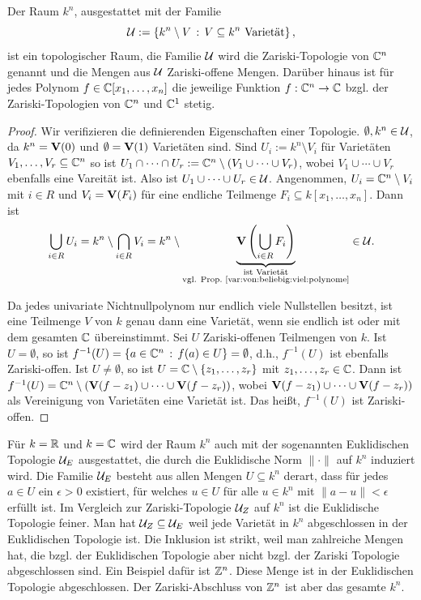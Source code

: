 \documentclass[11pt]{article}
\numberwithin{equation}{section}
\begin{document}
\begin{theorem}
	Der Raum $k^n$, ausgestattet  mit der Familie
	\[
	\mathcal{U}:=\left\{  k^n \setminus V  \,:\, V \subseteq k^n \ \text{Varietät} \right\},
	\] ist ein topologischer Raum, die Familie $\mathcal{U}$ wird die Zariski-Topologie von $\mathbb{C}^n$ genannt und die Mengen aus $\mathcal{U}$ Zariski-offene Mengen.  Darüber hinaus ist für jedes Polynom $f  \in \mathbb{C}[x_1,\ldots,x_n]$ die jeweilige Funktion $f : \mathbb{C}^n \to \mathbb{C}$ bzgl. der Zariski-Topologien von $\mathbb{C}^n$ und $\mathbb{C}^1$ stetig. 
\end{theorem} 
\begin{proof} 
	Wir verifizieren die definierenden Eigenschaften einer Topologie. 
	$\emptyset, k^n \in \mathcal{U}$, da $k^n = \mathbf{V}(0) $ und $\emptyset = \mathbf{V}(1)$ Varietäten sind. Sind $U_i := k^n \setminus V_i$ für Varietäten $V_1,\ldots,V_r \subseteq \mathbb{C}^n$ so ist $U_1 \cap \cdots \cap U_r := \mathbb{C}^n \setminus (V_1 \cup \cdots \cup V_r)$, wobei $V_1 \cup \cdots \cup V_r$ ebenfalls eine Vareität ist. Also ist $U_1 \cup \cdots \cup U_r \in \mathcal{U}$. Angenommen, $U_i = \mathbb{C}^n \setminus V_i$ mit $i \in R$ und $V_i = \mathbf{V}(F_i)$ für eine endliche Teilmenge $F_i \subseteq k[x_1,\ldots,x_n]$. Dann ist 
	\[
	\bigcup_{i \in R} U_i = k^n \setminus \bigcap_{i \in R} V_i = k^n \setminus  \underbrace{\mathbf{V} \left( \bigcup_{i \in R} F_i \right)}_{\substack{\text{ist Varietät} \\\text{vgl. Prop.~\ref{var:von:beliebig:viel:polynome}}}} \in \mathcal{U}.
	\]
	
	Da jedes univariate Nichtnullpolynom  nur endlich viele Nullstellen besitzt, ist eine Teilmenge $V$ von $k$ genau dann eine Varietät, wenn sie endlich ist oder mit dem gesamten $\mathbb{C}$ übereinstimmt. Sei $U$ Zariski-offenen Teilmengen von $k$. Ist $U = \emptyset$, so ist $f^{-1}(U) = \left\{ a \in \mathbb{C}^n \,:\, f(a) \in U \right\} = \emptyset$, d.h., $f^{-1}(U)$ ist ebenfalls Zariski-offen. Ist $U \ne \emptyset$, so ist $U = \mathbb{C} \setminus \{z_1,\ldots,z_r\}$ mit $z_1,\ldots,z_r \in \mathbb{C}$. Dann ist $f^{-1}(U) = \mathbb{C}^n \setminus (\mathbf{V}(f - z_1) \cup \cdots  \cup \mathbf{V}(f-z_r))$, wobei $\mathbf{V}(f - z_1) \cup  \cdots \cup \mathbf{V}(f - z_r))$ als Vereinigung von Varietäten eine Varietät ist. Das heißt, $f ^{-1}(U)$ ist Zariski-offen. 
\end{proof}

\begin{remark}
	Für $k= \mathbb{R}$ und $k = \mathbb{C}$ wird der Raum $k^n$ auch mit der sogenannten Euklidischen Topologie $\mathcal{U}_E$ ausgestattet, die durch die Euklidische Norm $\| \cdot \|$ auf $k^n$ induziert wird. Die Familie $\mathcal{U}_E$ besteht aus allen Mengen $U \subseteq k^n$ derart, dass für jedes $a \in U$ ein $\epsilon >0$ existiert, für welches $u \in U$ für alle $u \in k^n$ mit $\|a - u\| < \epsilon$ erfüllt ist. Im Vergleich zur Zariski-Topologie $\mathcal{U}_Z$ auf $k^n$ ist die Euklidische Topologie feiner. Man hat $\mathcal{U}_Z \subseteq \mathcal{U}_E$ weil jede Varietät in $k^n$ abgeschlossen in der Euklidischen Topologie ist. Die Inklusion ist strikt, weil man zahlreiche Mengen hat, die bzgl. der Euklidischen Topologie aber nicht bzgl. der Zariski Topologie abgeschlossen sind. Ein Beispiel dafür ist $\mathbb{Z}^n$. Diese Menge ist in der Euklidischen Topologie abgeschlossen. Der Zariski-Abschluss von $\mathbb{Z}^n$ ist aber das gesamte $k^n$. 
\end{remark}  
\end{document}
